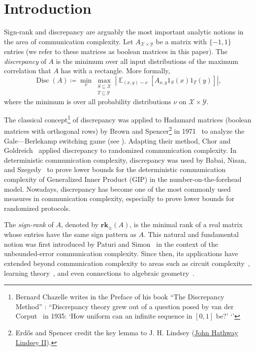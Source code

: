 \documentclass[11pt]{article}
\numberwithin{equation}{section}
\theoremstyle{definition}
\theoremstyle{plain}
\theoremstyle{definition}\newtheorem{problem}[theorem]{Problem}\theoremstyle{plain}
\DeclareMathOperator{\Ex}{{\mathbb E}}
\DeclareMathOperator{\Disc}{Disc}
\newcommand{\defeq}{\coloneqq}
\newcommand{\cX}{\mathcal{X}}
\newcommand{\cY}{\mathcal{Y}}
\newcommand{\srk}{\mathbf{rk}_{\pm}}   %
\begin{document}
%
%
%


\section{Introduction}

Sign-rank and discrepancy are arguably the most important analytic notions in the area of communication complexity. Let $A_{\cX \times \cY}$ be a matrix with $\{-1,1\}$ entries (we refer to these matrices as boolean matrices in this paper).
The \emph{discrepancy} of $A$ is the minimum over all input distributions 
of the maximum correlation that $A$ has with a rectangle.  More formally,
\begin{equation} 
\label{eq:disc}
\Disc(A) \defeq \min_{\nu} \max_{\substack{S \subseteq  \cX \\ T \subseteq \cY}}\left| \Ex_{(x,y) \sim \nu} [A_{x,y} 1_S(x) 1_T(y)]\right|,
\end{equation}
where the minimum is over all probability distributions $\nu$ on 
$\cX \times \cY$.
%
%
%
%
%
%
%
%
%
%
%
%
%
%
%
%
%
%
%
%
%
%
%
%
%
%
%
%
%

The classical concept\footnote{Bernard Chazelle writes in the Preface of his book ``The Discrepancy Method'' \cite{chazelle}:
``Discrepancy theory grew out of a question posed by van der Corput~\cite{corput} in 1935: `How uniform can an infinite sequence in $[0,1]$ be?' ‘'} of discrepancy was applied to Hadamard matrices (boolean matrices with orthogonal rows) by Brown and Spencer\footnote{Erd\H{o}s and Spencer credit the key lemma to J. H. Lindsey (\href{https://www.mathgenealogy.org/id.php?id=106133}{John Hathway Lindsey II}).} in 1971~\cite{switching-game} to analyze the Gale—Berlekamp switching game (see \cite[Ch. 15]{erdos-spencer}). Adapting their method, Chor and Goldreich~\cite{chor1988unbiased} applied discrepancy to randomized communication complexity. In deterministic communication complexity,  discrepancy was used by Babai, Nisan, and Szegedy~\cite{babai1992multiparty} to prove lower bounds for the deterministic communication complexity of Generalized Inner Product (GIP) in the number-on-the-forehead model. Nowadays, discrepancy has become one of the most commonly used measures in communication complexity, especially to prove lower bounds for randomized protocols.




The \emph{sign-rank} of $A$, denoted by $\srk(A)$, is the minimal rank 
of a real matrix
whose entries have the same sign pattern as $A$. This natural and fundamental
notion was  first introduced  by Paturi and 
Simon~\cite{paturi1986probabilistic} in the context of the unbounded-error communication complexity.  Since then,  its applications have extended beyond communication complexity   to areas  such as    circuit complexity~\cite{MR2592035,MR3577098}, learning theory~\cite{MR2359826,MR2497381,MR2059097}, and even connections to algebraic geometry~\cite{MR0226281}.
\end{document}
